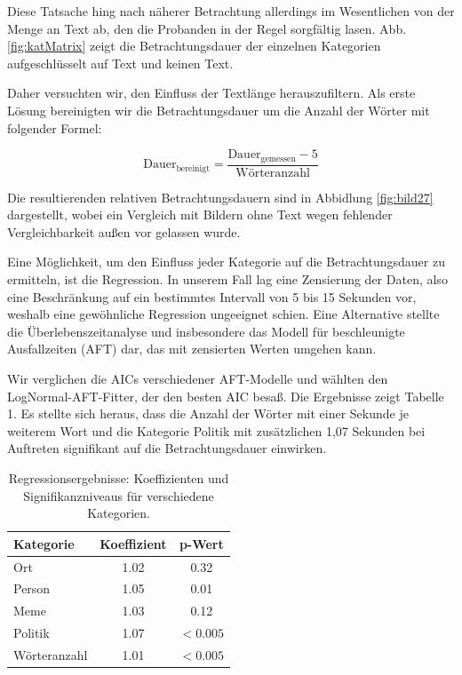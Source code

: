 \documentclass[
    language=german, %
    thesis=seminar, %
    supervisor=postdoc, %
    multiauthor=true, %
    ]{settings/csssa-thesis}
\begin{document}
Diese Tatsache hing nach näherer Betrachtung allerdings im Wesentlichen von der Menge an Text ab,
den die Probanden in der Regel sorgfältig lasen. Abb. \ref{fig:katMatrix} zeigt die Betrachtungsdauer der einzelnen 
Kategorien aufgeschlüsselt auf Text und keinen Text. 

Daher versuchten wir, den Einfluss der Textlänge herauszufiltern. Als erste Lösung bereinigten 
wir die Betrachtungsdauer um die Anzahl der Wörter mit folgender Formel:

\[
\text{Dauer}_{\text{bereinigt}} = \frac{\text{Dauer}_{\text{gemessen}} - 5}{\text{Wörteranzahl}}
\]


Die resultierenden relativen Betrachtungsdauern sind in Abbidlung \ref{fig:bild27} dargestellt, 
wobei ein Vergleich mit Bildern ohne Text wegen fehlender Vergleichbarkeit außen vor gelassen wurde.

Eine Möglichkeit, um den Einfluss jeder Kategorie auf die Betrachtungsdauer zu ermitteln, 
ist die Regression. In unserem Fall lag eine Zensierung der Daten, also eine Beschränkung 
auf ein bestimmtes Intervall von 5 bis 15 Sekunden vor, weshalb eine gewöhnliche Regression 
ungeeignet schien. Eine Alternative stellte die Überlebenszeitanalyse und insbesondere das Modell 
für beschleunigte Ausfallzeiten (AFT) dar, das mit zensierten Werten umgehen kann.

Wir verglichen die AICs verschiedener AFT-Modelle und wählten den LogNormal-AFT-Fitter, 
der den besten AIC besaß. Die Ergebnisse zeigt Tabelle 1. Es stellte sich heraus, dass die Anzahl 
der Wörter mit einer Sekunde je weiterem Wort und die Kategorie Politik mit zusätzlichen 1,07 Sekunden 
bei Auftreten signifikant auf die Betrachtungsdauer einwirken.

\begin{table}[htbp]
\centering
\begin{tabular}{lcc}
\hline
\textbf{Kategorie} & \textbf{Koeffizient} & \textbf{p-Wert} \\
\hline
Ort          & 1.02 & 0.32      \\
Person       & 1.05 & 0.01      \\
Meme         & 1.03 & 0.12      \\
Politik      & 1.07 & $<0.005$ \\
Wörteranzahl & 1.01 & $<0.005$ \\
\hline
\end{tabular}
\caption{Regressionsergebnisse: Koeffizienten und Signifikanzniveaus für verschiedene Kategorien.}
\label{tab:kategorien}
\end{table}
\end{document}
